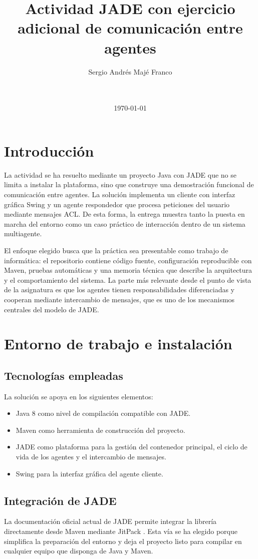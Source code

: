 \documentclass[12pt]{article}
\title{\textbf{Actividad JADE con ejercicio adicional de comunicación entre agentes}}
\author{Sergio Andrés Majé Franco}
\date{\Asignatura \\ \Universidad \\ \today}
\begin{document}
\maketitle
\tableofcontents
\newpage

\section{Introducción}
La actividad se ha resuelto mediante un proyecto Java con JADE que no se limita a instalar la plataforma, sino que construye una demostración funcional de comunicación entre agentes. La solución implementa un cliente con interfaz gráfica Swing y un agente respondedor que procesa peticiones del usuario mediante mensajes ACL. De esta forma, la entrega muestra tanto la puesta en marcha del entorno como un caso práctico de interacción dentro de un sistema multiagente.

El enfoque elegido busca que la práctica sea presentable como trabajo de informática: el repositorio contiene código fuente, configuración reproducible con Maven, pruebas automáticas y una memoria técnica que describe la arquitectura y el comportamiento del sistema. La parte más relevante desde el punto de vista de la asignatura es que los agentes tienen responsabilidades diferenciadas y cooperan mediante intercambio de mensajes, que es uno de los mecanismos centrales del modelo de JADE.

\section{Entorno de trabajo e instalación}
\subsection{Tecnologías empleadas}
La solución se apoya en los siguientes elementos:

\begin{itemize}[leftmargin=*]
  \item Java 8 como nivel de compilación compatible con JADE.
  \item Maven como herramienta de construcción del proyecto.
  \item JADE como plataforma para la gestión del contenedor principal, el ciclo de vida de los agentes y el intercambio de mensajes.
  \item Swing para la interfaz gráfica del agente cliente.
\end{itemize}

\subsection{Integración de JADE}
La documentación oficial actual de JADE permite integrar la librería directamente desde Maven mediante JitPack \cite{jade-download}. Esta vía se ha elegido porque simplifica la preparación del entorno y deja el proyecto listo para compilar en cualquier equipo que disponga de Java y Maven.
\end{document}
